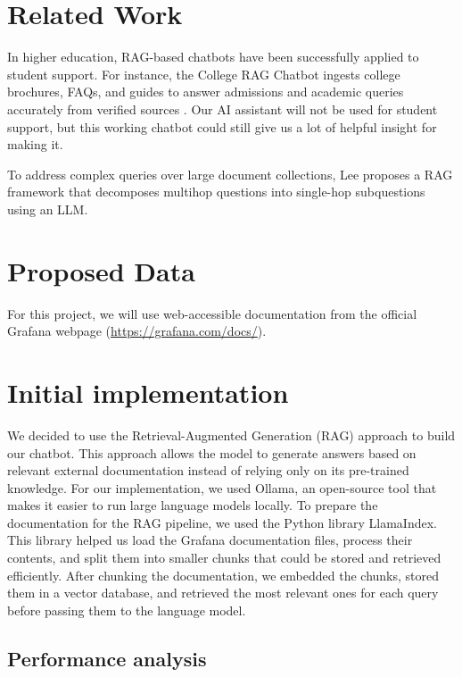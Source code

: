 \documentclass[fleqn,moreauthors,10pt]{ds_report}
\begin{document}
\section*{Related Work}

    In higher education, RAG-based chatbots have been successfully applied to student support. For instance, the College RAG Chatbot ingests college brochures, FAQs, and guides to answer admissions and academic queries accurately from verified sources \cite{college_rag_chatbot_github}. Our AI assistant will not be used for student support, but this working chatbot could still give us a lot of helpful insight for making it.
    
    To address complex queries over large document collections, Lee \cite{lee2025transforming} proposes a RAG framework that decomposes multihop questions into single-hop subquestions using an LLM.

\section*{Proposed Data}

    For this project, we will use web-accessible documentation from the official Grafana webpage (\url{https://grafana.com/docs/}).

\section*{Initial implementation}

We decided to use the Retrieval-Augmented Generation (RAG) approach to build our chatbot. This approach allows the model to generate answers based on relevant external documentation instead of relying only on its pre-trained knowledge. For our implementation, we used Ollama, an open-source tool that makes it easier to run large language models locally. To prepare the documentation for the RAG pipeline, we used the Python library LlamaIndex. This library helped us load the Grafana documentation files, process their contents, and split them into smaller chunks that could be stored and retrieved efficiently. After chunking the documentation, we embedded the chunks, stored them in a vector database, and retrieved the most relevant ones for each query before passing them to the language model.

\subsection*{Performance analysis}
\end{document}
